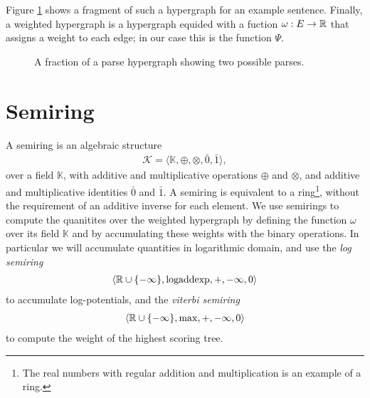   Figure \ref{fig:hypergraph} shows a fragment of such a hypergraph for an example sentence. Finally, a weighted hypergraph is a hypergraph equided with a fuction $\omega : E \to \reals$ that assigns a weight to each edge; in our case this is the function $\Psi$.

\begin{figure}[h]
  \center
  \begin{tikzpicture}[scale=.6]
    
  \end{tikzpicture}
  \caption{A fraction of a parse hypergraph showing two possible parses.}
  \label{fig:hypergraph}
\end{figure}


\section{Semiring}
  A semiring is an algebraic structure
  \begin{align*}
    \mathcal{K} = \langle \mathbb{K}, \oplus, \otimes, \bar{0}, \bar{1} \rangle,
  \end{align*}
  over a field $\mathbb{K}$, with additive and multiplicative operations $\oplus$ and $\otimes$, and additive and multiplicative identities $\bar{0}$ and $\bar{1}$. A semiring  is equivalent to a ring\footnote{The real numbers with regular addition and multiplication is an example of a ring.}, without the requirement of an additive inverse for each element. We use semirings to compute the quanitites over the weighted hypergraph by defining the function $\omega$ over its field $\mathbb{K}$ and by accumulating these weights with the binary operations. In particular we will accumulate quantities in logarithmic domain, and use the \textit{log semiring}
  \begin{align}
    \langle \reals \cup \{ -\infty \}, \text{logaddexp}, +, -\infty, 0 \rangle
  \end{align}
  to accumulate log-potentials, and the \textit{viterbi semiring}
  \begin{align}
    \langle \reals \cup \{ -\infty \}, \max, +, -\infty, 0 \rangle
  \end{align}
  to compute the weight of the highest scoring tree.


